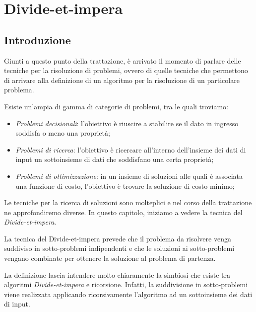\chapter{Divide-et-impera}\label{chap:divide-et-impera}
\section{Introduzione}
Giunti a questo punto della trattazione, è arrivato il momento di parlare delle
tecniche per la risoluzione di problemi, ovvero di quelle tecniche che permettono
di arrivare alla definizione di un algoritmo per la risoluzione di un particolare
problema.

Esiste un'ampia di gamma di categorie di problemi, tra le quali troviamo:
\begin{itemize}
    \item \emph{Problemi decisionali}: l'obiettivo è riuscire a stabilire se il
    dato in ingresso soddisfa o meno una proprietà;
    \item \emph{Problemi di ricerca}: l'obiettivo è ricercare all'interno
    dell'insieme dei dati di input un sottoinsieme di dati che soddisfano una
    certa proprietà;
    \item \emph{Problemi di ottimizzazione}: in un insieme di soluzioni alle
    quali è associata una funzione di costo, l'obiettivo è trovare la soluzione
    di costo minimo;
\end{itemize}
Le tecniche per la ricerca di soluzioni sono molteplici e nel corso della
trattazione ne approfondiremo diverse. In questo capitolo, iniziamo a vedere
la tecnica del \emph{Divide-et-impera}.

\begin{definition}
    La tecnica del Divide-et-impera prevede che il problema da risolvere venga
    suddiviso in sotto-problemi indipendenti e che le soluzioni ai sotto-problemi
    vengano combinate per ottenere la soluzione al problema di partenza.
\end{definition}\noindent
La definizione lascia intendere molto chiaramente la simbiosi che esiste tra
algoritmi \emph{Divide-et-impera} e ricorsione. Infatti, la suddivisione in
sotto-problemi viene realizzata applicando ricorsivamente l'algoritmo ad un
sottoinsieme dei dati di input.

